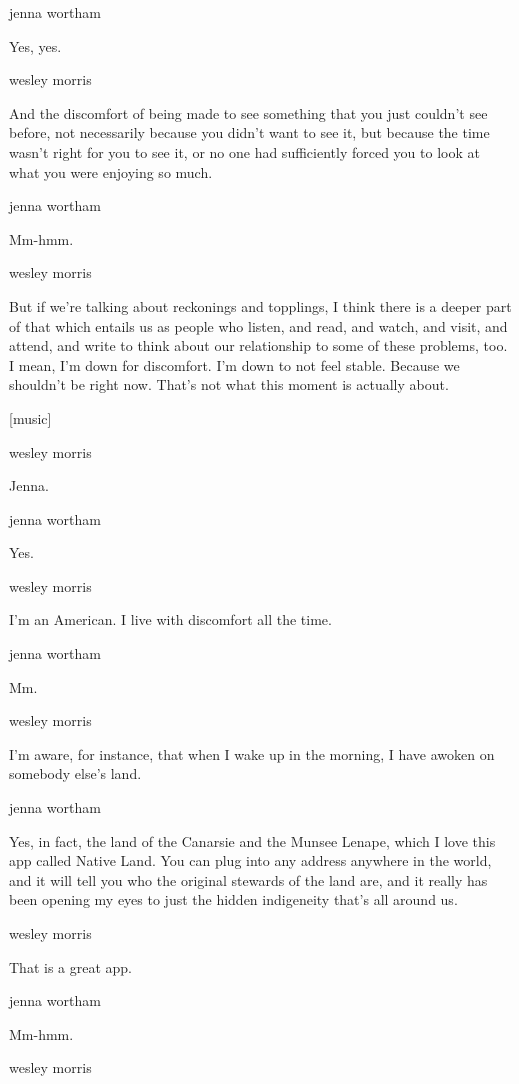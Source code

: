 jenna wortham

Yes, yes.

wesley morris

And the discomfort of being made to see something that you just couldn't
see before, not necessarily because you didn't want to see it, but
because the time wasn't right for you to see it, or no one had
sufficiently forced you to look at what you were enjoying so much.

jenna wortham

Mm-hmm.

wesley morris

But if we're talking about reckonings and topplings, I think there is a
deeper part of that which entails us as people who listen, and read, and
watch, and visit, and attend, and write to think about our relationship
to some of these problems, too. I mean, I'm down for discomfort. I'm
down to not feel stable. Because we shouldn't be right now. That's not
what this moment is actually about.

{[}music{]}

wesley morris

Jenna.

jenna wortham

Yes.

wesley morris

I'm an American. I live with discomfort all the time.

jenna wortham

Mm.

wesley morris

I'm aware, for instance, that when I wake up in the morning, I have
awoken on somebody else's land.

jenna wortham

Yes, in fact, the land of the Canarsie and the Munsee Lenape, which I
love this app called Native Land. You can plug into any address anywhere
in the world, and it will tell you who the original stewards of the land
are, and it really has been opening my eyes to just the hidden
indigeneity that's all around us.

wesley morris

That is a great app.

jenna wortham

Mm-hmm.

wesley morris

